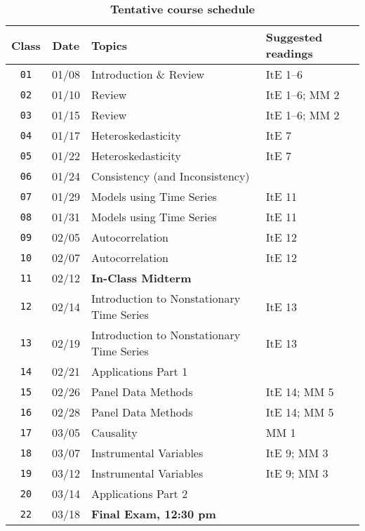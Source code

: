 \documentclass[10pt]{article}
\newcommand{\ra}[1]{\renewcommand{\arraystretch}{#1}}
\begin{document}
\begin{table}[htb]
  \caption*{\textbf{Tentative course schedule}}
  \ra{1.5}
  \begin{tabular}{@{\extracolsep{1cm}} c c l l @{}}
    \toprule
    \textbf{Class} & \textbf{Date} & \textbf{Topics} & \textbf{Suggested readings}  \\ \toprule
    \texttt{01} & 01/08 & Introduction \& Review & ItE 1--6 \\
    \texttt{02} & 01/10 & Review & ItE 1--6; MM 2 \\
    \texttt{03} & 01/15 & Review & ItE 1--6; MM 2 \\
    \texttt{04} & 01/17 & Heteroskedasticity & ItE 7 \\
    \texttt{05} & 01/22 & Heteroskedasticity & ItE 7  \\
    \texttt{06} & 01/24 & Consistency (and Inconsistency) &  \\
    \texttt{07} & 01/29 & Models using Time Series & ItE 11  \\
    \texttt{08} & 01/31 & Models using Time Series & ItE 11  \\
    \texttt{09} & 02/05 & Autocorrelation & ItE 12 \\
    \texttt{10} & 02/07 & Autocorrelation & ItE 12 \\ \midrule
    \texttt{11} & 02/12 & \textbf{In-Class Midterm} \\ \midrule
    \texttt{12} & 02/14 & Introduction to Nonstationary Time Series & ItE 13 \\
    \texttt{13} & 02/19 & Introduction to Nonstationary Time Series & ItE 13 \\
    \texttt{14} & 02/21 & Applications Part 1 &  \\
    \texttt{15} & 02/26 & Panel Data Methods & ItE 14; MM 5 \\
    \texttt{16} & 02/28 & Panel Data Methods & ItE 14; MM 5 \\
    \texttt{17} & 03/05 & Causality & MM 1 \\
    \texttt{18} & 03/07 & Instrumental Variables & ItE 9; MM 3 \\
    \texttt{19} & 03/12 & Instrumental Variables & ItE 9; MM 3 \\
    \texttt{20} & 03/14 & Applications Part 2 & \\ \midrule
    \texttt{22} & 03/18 & \textbf{Final Exam, 12:30 pm} & \\
    \bottomrule
  \end{tabular}
\end{table}
\end{document}
